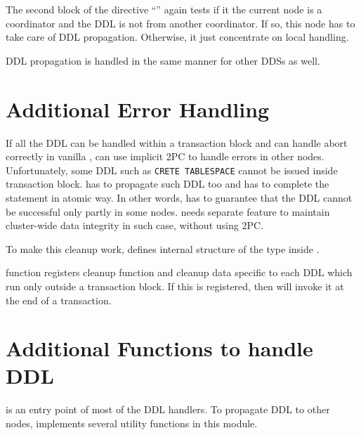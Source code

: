   The second block of the directive ``'' again tests if it the current node is a coordinator and
  the DDL is not from another coordinator.
  If so, this node has to take care of DDL propagation.
  Otherwise, it just concentrate on local handling.
  
  DDL propagation is handled in the same manner for other DDSs as well.



\section{Additional Error Handling}

  If all the DDL can be handled within a transaction block and can handle abort correctly in vanilla \PG,
  \XC{} can use implicit 2PC to handle errors in other nodes.
  Unfortunately, some DDL such as \texttt{CRETE TABLESPACE} cannot be issued inside transaction block.
  \XC{} has to propagate such DDL too and has to complete the statement in atomic way.
  In other words, \XC{} has to guarantee that the DDL cannot be successful only partly in some nodes.
  \XC{} needs separate feature to maintain cluster-wide
  data integrity in such case, without using 2PC.
  
  To make this cleanup work, \XC{} defines internal structure  of the type
   inside .
  
   function registers cleanup function and cleanup data specific to each
  DDL which run only outside a transaction block.
  If this is registered, then  will invoke it at the end of a transaction.



\section{Additional Functions to handle DDL}

   is an entry point of most of the DDL handlers.
  To propagate DDL to other nodes, \XC{} implements several utility functions in this module.




